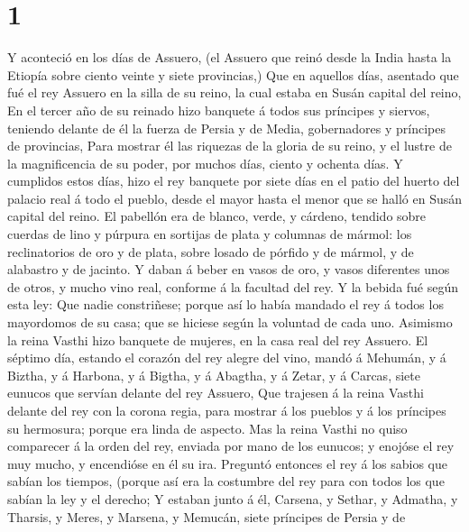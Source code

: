 \hypertarget{section}{%
\section{1}\label{section}}

 Y aconteció en los días de Assuero, (el Assuero que reinó
desde la India hasta la Etiopía sobre ciento veinte y siete provincias,)
 Que en aquellos días, asentado que fué el rey Assuero en
la silla de su reino, la cual estaba en Susán capital del reino,
 En el tercer año de su reinado hizo banquete á todos sus
príncipes y siervos, teniendo delante de él la fuerza de Persia y de
Media, gobernadores y príncipes de provincias,  Para
mostrar él las riquezas de la gloria de su reino, y el lustre de la
magnificencia de su poder, por muchos días, ciento y ochenta días.
 Y cumplidos estos días, hizo el rey banquete por siete
días en el patio del huerto del palacio real á todo el pueblo, desde el
mayor hasta el menor que se halló en Susán capital del reino.
 El pabellón era de blanco, verde, y cárdeno, tendido
sobre cuerdas de lino y púrpura en sortijas de plata y columnas de
mármol: los reclinatorios de oro y de plata, sobre losado de pórfido y
de mármol, y de alabastro y de jacinto.  Y daban á beber
en vasos de oro, y vasos diferentes unos de otros, y mucho vino real,
conforme á la facultad del rey.  Y la bebida fué según
esta ley: Que nadie constriñese; porque así lo había mandado el rey á
todos los mayordomos de su casa; que se hiciese según la voluntad de
cada uno.  Asimismo la reina Vasthi hizo banquete de
mujeres, en la casa real del rey Assuero.  El séptimo
día, estando el corazón del rey alegre del vino, mandó á Mehumán, y á
Biztha, y á Harbona, y á Bigtha, y á Abagtha, y á Zetar, y á Carcas,
siete eunucos que servían delante del rey Assuero,  Que
trajesen á la reina Vasthi delante del rey con la corona regia, para
mostrar á los pueblos y á los príncipes su hermosura; porque era linda
de aspecto.  Mas la reina Vasthi no quiso comparecer á la
orden del rey, enviada por mano de los eunucos; y enojóse el rey muy
mucho, y encendióse en él su ira.  Preguntó entonces el
rey á los sabios que sabían los tiempos, (porque así era la costumbre
del rey para con todos los que sabían la ley y el derecho;
 Y estaban junto á él, Carsena, y Sethar, y Admatha, y
Tharsis, y Meres, y Marsena, y Memucán, siete príncipes de Persia y de
